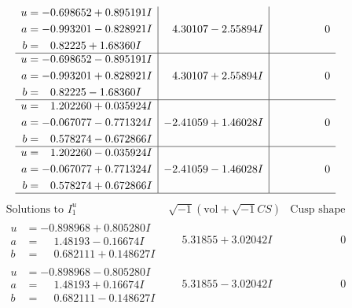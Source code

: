 \documentclass[1p]{elsarticle_modified}
\theoremstyle{definition}
\newcommand{\I}{\sqrt{-1}}
\begin{document}
$$\begin{array}{c|c|c}
\begin{aligned}
u &= -0.698652 + 0.895191 I \\
a &= -0.993201 - 0.828921 I \\
b &= \phantom{-}0.82225 + 1.68360 I\end{aligned}
 & \phantom{-}4.30107 - 2.55894 I & \phantom{-0.000000 } 0 \\ \hline\begin{aligned}
u &= -0.698652 - 0.895191 I \\
a &= -0.993201 + 0.828921 I \\
b &= \phantom{-}0.82225 - 1.68360 I\end{aligned}
 & \phantom{-}4.30107 + 2.55894 I & \phantom{-0.000000 } 0 \\ \hline\begin{aligned}
u &= \phantom{-}1.202260 + 0.035924 I \\
a &= -0.067077 - 0.771324 I \\
b &= \phantom{-}0.578274 - 0.672866 I\end{aligned}
 & -2.41059 + 1.46028 I & \phantom{-0.000000 } 0 \\ \hline\begin{aligned}
u &= \phantom{-}1.202260 - 0.035924 I \\
a &= -0.067077 + 0.771324 I \\
b &= \phantom{-}0.578274 + 0.672866 I\end{aligned}
 & -2.41059 - 1.46028 I & \phantom{-0.000000 } 0\\
 \hline 
 \end{array}$$\newpage$$\begin{array}{c|c|c}  
\text{Solutions to }I^u_{1}& \I (\text{vol} + \sqrt{-1}CS) & \text{Cusp shape}\\
 \hline 
\begin{aligned}
u &= -0.898968 + 0.805280 I \\
a &= \phantom{-}1.48193 - 0.16674 I \\
b &= \phantom{-}0.682111 + 0.148627 I\end{aligned}
 & \phantom{-}5.31855 + 3.02042 I & \phantom{-0.000000 } 0 \\ \hline\begin{aligned}
u &= -0.898968 - 0.805280 I \\
a &= \phantom{-}1.48193 + 0.16674 I \\
b &= \phantom{-}0.682111 - 0.148627 I\end{aligned}
 & \phantom{-}5.31855 - 3.02042 I & \phantom{-0.000000 } 0 \\ \hline\begin{aligned}

\end{aligned}
\end{array}$$
\end{document}
